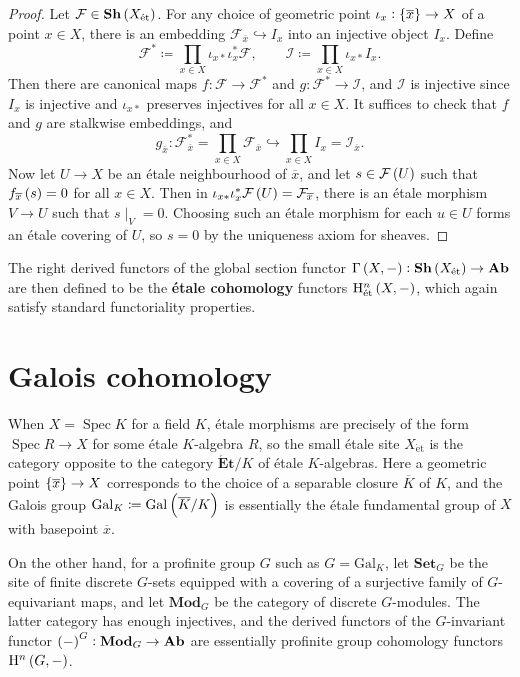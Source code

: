 \documentclass{article}
\newcommand{\Ab}{\mathbf{Ab}}
\newcommand{\br}{\del}
\newcommand{\et}{\mathrm{\acute{e}t}}
\newcommand{\Et}{\mathbf{\acute{E}t}}
\newcommand{\F}{\mathcal{F}}
\newcommand{\Gal}{\mathrm{Gal}}
\renewcommand{\H}{\mathrm{H}}
\newcommand{\I}{\mathcal{I}}
\newcommand{\Mod}{\mathbf{Mod}}
\newcommand{\Set}{\mathbf{Set}}
\newcommand{\Sh}{\mathbf{Sh}}
\newcommand{\Spec}{\operatorname{Spec}}
\begin{document}
\begin{proof}
Let $ \F \in \Sh\br{X_\et} $. For any choice of geometric point $ \iota_x : \cbr{\overline{x}} \to X $ of a point $ x \in X $, there is an embedding $ \F_{\overline{x}} \hookrightarrow I_x $ into an injective object $ I_x $. Define
$$ \F^* \coloneqq \prod_{x \in X} \iota_{x*}\iota_x^*\F, \qquad \I \coloneqq \prod_{x \in X} \iota_{x*}I_x. $$
Then there are canonical maps $ f : \F \to \F^* $ and $ g : \F^* \to \I $, and $ \I $ is injective since $ I_x $ is injective and $ \iota_{x*} $ preserves injectives for all $ x \in X $. It suffices to check that $ f $ and $ g $ are stalkwise embeddings, and
$$ g_{\overline{x}} : \F_{\overline{x}}^* = \prod_{x \in X} \F_{\overline{x}} \hookrightarrow \prod_{x \in X} I_x = \I_{\overline{x}}. $$
Now let $ U \to X $ be an \'etale neighbourhood of $ \overline{x} $, and let $ s \in \F\br{U} $ such that $ f_{\overline{x}}\br{s} = 0 $ for all $ x \in X $. Then in $ \iota_{x*}\iota_x^*\F\br{U} = \F_{\overline{x}} $, there is an \'etale morphism $ V \to U $ such that $ s\mid_V = 0 $. Choosing such an \'etale morphism for each $ u \in U $ forms an \'etale covering of $ U $, so $ s = 0 $ by the uniqueness axiom for sheaves.
\end{proof}

The right derived functors of the global section functor $ \Gamma\br{X, -} : \Sh\br{X_\et} \to \Ab $ are then defined to be the \textbf{\'etale cohomology} functors $ \H_\et^n\br{X, -} $, which again satisfy standard functoriality properties.

\pagebreak

\section{Galois cohomology}

When $ X = \Spec K $ for a field $ K $, \'etale morphisms are precisely of the form $ \Spec R \to X $ for some \'etale $ K $-algebra $ R $, so the small \'etale site $ X_\et $ is the category opposite to the category $ \Et / K $ of \'etale $ K $-algebras. Here a geometric point $ \cbr{\overline{x}} \to X $ corresponds to the choice of a separable closure $ \overline{K} $ of $ K $, and the Galois group $ \Gal_K \coloneqq \Gal\br{\overline{K} / K} $ is essentially the \'etale fundamental group of $ X $ with basepoint $ \overline{x} $.

On the other hand, for a profinite group $ G $ such as $ G = \Gal_K $, let $ \Set_G $ be the site of finite discrete $ G $-sets equipped with a covering of a surjective family of $ G $-equivariant maps, and let $ \Mod_G $ be the category of discrete $ G $-modules. The latter category has enough injectives, and the derived functors of the $ G $-invariant functor $ \br{-}^G : \Mod_G \to \Ab $ are essentially profinite group cohomology functors $ \H^n\br{G, -} $.
\end{document}
